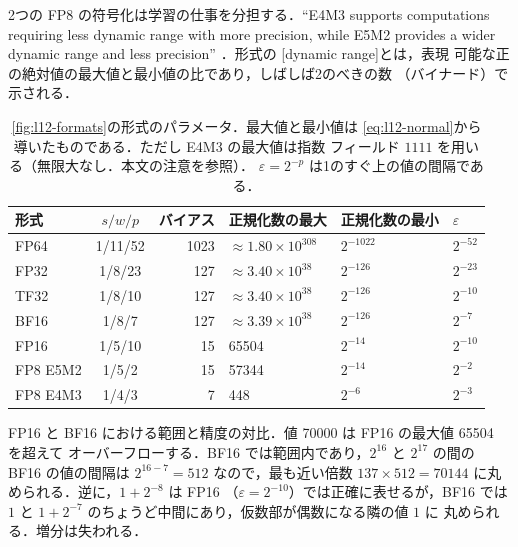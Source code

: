 \documentclass[../main.tex]{subfiles}
\begin{document}
2つの FP8 の符号化は学習の仕事を分担する．\enquote{E4M3 supports
computations requiring less dynamic range with more precision, while E5M2
provides a wider dynamic range and less precision}
\cite{nvidia2022hopper}．形式の
[dynamic range]とは，表現
可能な正の絶対値の最大値と最小値の比であり，しばしば2のべきの数
（バイナード）で示される．

\begin{table}[htbp]
  \centering
  \caption{\cref{fig:l12-formats}の形式のパラメータ．最大値と最小値は
    \cref{eq:l12-normal}から導いたものである．ただし E4M3 の最大値は指数
    フィールド $1111$ を用いる（無限大なし．本文の注意を参照）．
    $\varepsilon = 2^{-p}$ は1のすぐ上の値の間隔である．}
  \label{tab:l12-formats}
  \setlength{\tabcolsep}{4pt}
  \begin{tabular}{lcrlll}
    \toprule
    形式 & $s/w/p$ & バイアス & 正規化数の最大 & 正規化数の最小 & $\varepsilon$ \\
    \midrule
    FP64 & 1/11/52 & 1023 & $\approx 1.80 \times 10^{308}$ & $2^{-1022}$ & $2^{-52}$ \\
    FP32 & 1/8/23 & 127 & $\approx 3.40 \times 10^{38}$ & $2^{-126}$ & $2^{-23}$ \\
    TF32 & 1/8/10 & 127 & $\approx 3.40 \times 10^{38}$ & $2^{-126}$ & $2^{-10}$ \\
    BF16 & 1/8/7 & 127 & $\approx 3.39 \times 10^{38}$ & $2^{-126}$ & $2^{-7}$ \\
    \addlinespace
    FP16 & 1/5/10 & 15 & \num{65504} & $2^{-14}$ & $2^{-10}$ \\
    FP8 E5M2 & 1/5/2 & 15 & \num{57344} & $2^{-14}$ & $2^{-2}$ \\
    FP8 E4M3 & 1/4/3 & 7 & 448 & $2^{-6}$ & $2^{-3}$ \\
    \bottomrule
  \end{tabular}
\end{table}



\begin{example}
  \label{ex:l12-bf16}
  FP16 と BF16 における範囲と精度の対比．値 \num{70000} は FP16 の最大値 \num{65504} を超えて
  オーバーフローする．BF16 では範囲内であり，$2^{16}$ と $2^{17}$ の間の
  BF16 の値の間隔は $2^{16-7} = 512$ なので，最も近い倍数
  $137 \times 512 = \num{70144}$ に丸められる．逆に，$1 + 2^{-8}$ は FP16
  （$\varepsilon = 2^{-10}$）では正確に表せるが，BF16 では $1$ と
  $1 + 2^{-7}$ のちょうど中間にあり，仮数部が偶数になる隣の値 $1$ に
  丸められる．増分は失われる．
\end{example}
\end{document}
